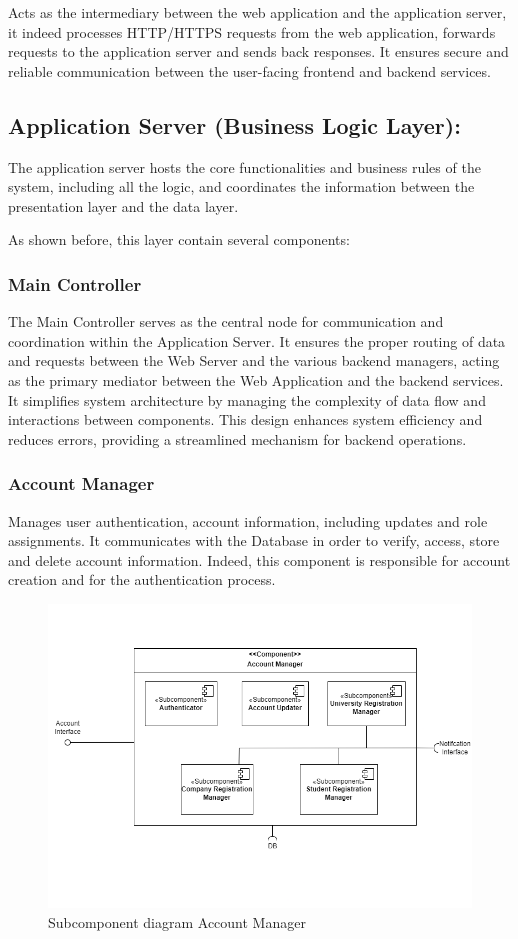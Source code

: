 Acts as the intermediary between the web application and the application server, it indeed processes HTTP/HTTPS requests from the web application, forwards requests to the application server and sends back responses. It ensures secure and reliable communication between the user-facing frontend and backend services.


\subsection{Application Server (Business Logic Layer):}
\label{subsec:application_server}%

The application server hosts the core functionalities and business rules of the system, including all the logic, and coordinates the information between the presentation layer and the data layer.

As shown before, this layer contain several components:
\subsubsection{Main Controller}
The Main Controller serves as the central node for communication and coordination within the Application Server. It ensures the proper routing of data and requests between the Web Server and the various backend managers, acting as the primary mediator between the Web Application and the backend services.
It simplifies system architecture by managing the complexity of data flow and interactions between components. This design enhances system efficiency and reduces errors, providing a streamlined mechanism for backend operations.

\subsubsection{Account Manager}
         Manages user authentication, account information, including updates and role assignments. It communicates with the Database in order to verify, access, store and delete account information. Indeed, this component is responsible for account creation and for the authentication process.
    
    \begin{figure}[H]
    \centering
    \includegraphics[width=0.7\linewidth]{DD/Images/Comp&Sub/Account Manager.png}
    \caption{Subcomponent diagram Account Manager}
    \label{fig:account_manager}
    \end{figure}

